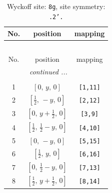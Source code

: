 \documentclass[fleqn,8pt]{jsarticle}
\begin{document}
\renewcommand{\arraystretch}{1.2}
\begin{longtable}{ccc}
\caption{Wyckoff site: {\tt 8g}, site symmetry: {\tt .2'.}}
 \\
 \hline \hline
No. & position & mapping \\ \hline \endfirsthead

\multicolumn{2}{l}{\tablename\ \thetable{}} \\
 \hline \hline
No. & position & mapping \\ \hline \endhead

 \hline \hline
\multicolumn{2}{r}{\footnotesize\it continued ...} \\ \endfoot

 \hline \hline
\multicolumn{2}{r}{} \\ \endlastfoot

1 & $\left[ 0,\, y,\, 0 \right]$ & {\tt [1,11]} \\ \hline
2 & $\left[ \frac{1}{2},\, - y,\, 0 \right]$ & {\tt [2,12]} \\ \hline
3 & $\left[ 0,\, y + \frac{1}{2},\, 0 \right]$ & {\tt [3,9]} \\ \hline
4 & $\left[ \frac{1}{2},\, \frac{1}{2} - y,\, 0 \right]$ & {\tt [4,10]} \\ \hline
5 & $\left[ 0,\, - y,\, 0 \right]$ & {\tt [5,15]} \\ \hline
6 & $\left[ \frac{1}{2},\, y,\, 0 \right]$ & {\tt [6,16]} \\ \hline
7 & $\left[ 0,\, \frac{1}{2} - y,\, 0 \right]$ & {\tt [7,13]} \\ \hline
8 & $\left[ \frac{1}{2},\, y + \frac{1}{2},\, 0 \right]$ & {\tt [8,14]} \\
\end{longtable}
\renewcommand{\arraystretch}{1.2}
\end{document}
